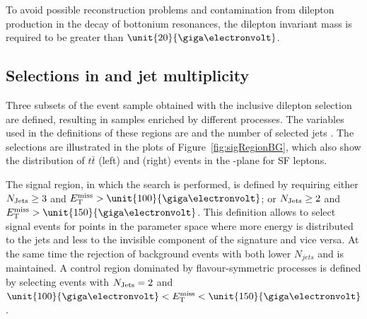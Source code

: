To avoid possible reconstruction problems and contamination from dilepton production in the decay of bottonium resonances, the dilepton invariant mass \mll is required to be greater than $\unit{20}{\giga\electronvolt}$. 


\subsection{Selections in \MET and jet multiplicity}
\label{sec:regions}
Three subsets of the event sample obtained with the inclusive dilepton selection are defined, resulting in samples enriched by different processes. The variables used in the definitions of these regions are \MET and the number of selected jets \njets. The selections are illustrated in the plots of Figure~\ref{fig:sigRegionBG}, which also show the distribution of $t\bar{t}$ (left) and \Zjets (right) events in the \MET-\njets plane for SF leptons. 
 
The signal region, in which the search is performed, is defined by requiring either $N_\text{Jets} \geq 3$ and $\MET > \unit{100}{\giga\electronvolt}$; or $N_\text{Jets} \geq 2$ and $\MET > \unit{150}{\giga\electronvolt}$. This definition allows to select signal events for points in the parameter space where more energy is distributed to the jets and less to the invisible component of the signature and vice versa. At the same time the rejection of background events with both lower $N_{jets}$ and \MET is maintained. A control region dominated by flavour-symmetric processes is defined by selecting events with $N_\text{Jets} = 2$ and $\unit{100}{\giga\electronvolt} < \MET < \unit{150}{\giga\electronvolt}$. 

